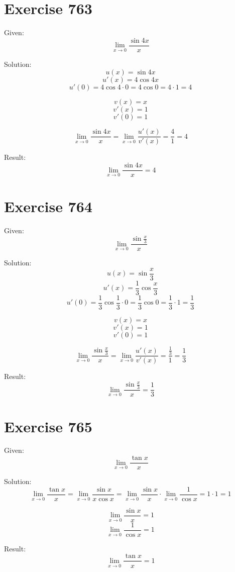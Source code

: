 \documentclass[a4paper, 10pt]{scrartcl}
\begin{document}
\section{Exercise 763}

Given:
\[\lim_{x\to 0}{\frac{\sin{4x}}{x}}\]

Solution:
\[u(x) = \sin{4x}\]
\[u'(x) = 4\cos{4x}\]
\[u'(0) = 4\cos{4\cdot 0} = 4\cos{0} = 4\cdot 1 = 4\]

\[v(x) = x\]
\[v'(x) = 1\]
\[v'(0) = 1\]

\[\lim_{x\to 0}{\frac{\sin{4x}}{x}} = \lim_{x\to 0}{\frac{u'(x)}{v'(x)}} = \frac{4}{1} = 4\]

Result:
\[\lim_{x\to 0}{\frac{\sin{4x}}{x}} = 4\]

\section{Exercise 764}

Given:
\[\lim_{x\to 0}{\frac{\sin{\frac{x}{3}}}{x}}\]

Solution:
\[u(x) = \sin{\frac{x}{3}}\]
\[u'(x) = \frac{1}{3}\cos{\frac{x}{3}}\]
\[u'(0) = \frac{1}{3}\cos{\frac{1}{3}\cdot 0} = \frac{1}{3}\cos{0} = \frac{1}{3}\cdot 1 = \frac{1}{3}\]

\[v(x) = x\]
\[v'(x) = 1\]
\[v'(0) = 1\]

\[\lim_{x\to 0}{\frac{\sin{\frac{x}{3}}}{x}} = \lim_{x\to 0}{\frac{u'(x)}{v'(x)}} = \frac{\frac{1}{3}}{1} = \frac{1}{3}\]

Result:
\[\lim_{x\to 0}{\frac{\sin{\frac{x}{3}}}{x}} = \frac{1}{3}\]

\section{Exercise 765}

Given:
\[\lim_{x\to 0}{\frac{\tan{x}}{x}}\]

Solution:
\[\lim_{x\to 0}{\frac{\tan{x}}{x}} = \lim_{x\to 0}{\frac{\sin{x}}{x\cos{x}}} =
\lim_{x\to 0}{\frac{\sin{x}}{x}}\cdot\lim_{x\to 0}{\frac{1}{\cos{x}}} = 1\cdot 1 = 1\]

\[\lim_{x\to 0}{\frac{\sin{x}}{x}} = 1\]
\[\lim_{x\to 0}{\frac{1}{\cos{x}}} = 1\]

Result:
\[\lim_{x\to 0}{\frac{\tan{x}}{x}} = 1\]
\end{document}
